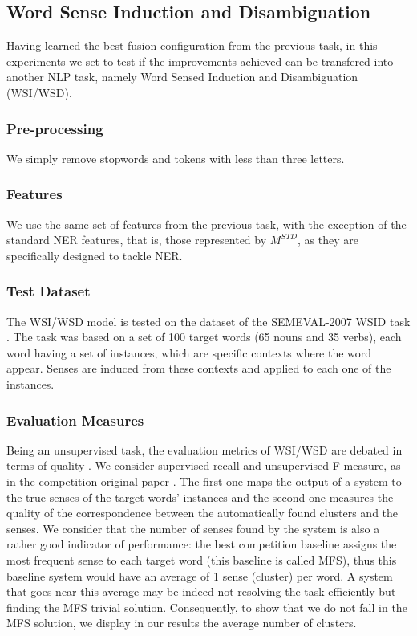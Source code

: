 \documentclass{llncs}
\begin{document}
\subsection{Word Sense Induction and Disambiguation}
Having learned the best fusion configuration from the previous task, in this experiments we set to test if the improvements achieved can be transfered into another NLP task, namely Word Sensed Induction and Disambiguation (WSI/WSD).

\subsubsection{Pre-processing}
We simply remove stopwords and tokens with less than three letters.
\subsubsection{Features}
We use the same set of features from the previous task, with the exception of the standard NER features, that is, those represented by $M^{STD}$, as they are specifically designed to tackle NER.
\subsubsection{Test Dataset}
The WSI/WSD model is tested on the dataset of  the SEMEVAL-2007 WSID task \cite{Agirre2007}. The task was based on a set of 100 target words (65 nouns and 35 verbs), each  word having a set of instances, which are specific contexts where the word appear. Senses are induced from these contexts and applied to each one of the instances.


\subsubsection{Evaluation Measures}
Being an unsupervised task, the evaluation metrics of WSI/WSD are debated in terms of quality \cite{CruysA11}. We consider supervised recall and unsupervised F-measure, as in the competition original paper \cite{Agirre2007}. The first one maps the output of a system to the true senses of the target words' instances and the second one measures the quality of the correspondence between the automatically found clusters and the senses. 
We consider that the number of senses found by the system is also a rather good indicator of performance: the best competition baseline assigns the most frequent sense to each target word (this baseline is called MFS), thus this baseline system would have an average of 1 sense (cluster) per word. A system that goes near this average may be indeed not resolving the task efficiently but finding the MFS trivial solution. Consequently, to show that we do not fall in the MFS solution, we display in our results the average number of clusters.
\end{document}

